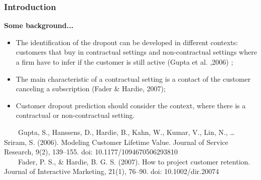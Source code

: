 \documentclass[10pt]{beamer}
\begin{document}
\begin{frame}
	\frametitle{Introduction}
	\Large
	\textbf{Some background...}\\
		\begin{itemize} \normalsize
			\item The identification of the dropout can be developed in different contexts: customers that buy in contractual settings and non-contractual settings where a firm have to infer if the customer is still active \footnotesize(Gupta et al. ,2006) \normalsize;
			\item The main characteristic of a contractual setting is a contact of the customer canceling a subscription \footnotesize(Fader \& Hardie, 2007)\normalsize;
			\item Customer dropout prediction should consider the context, where there is a contractual or non-contractual setting.
		\end{itemize}	
	\tiny
	~~~~Gupta, S., Hanssens, D., Hardie, B., Kahn, W., Kumar, V., Lin, N., … Sriram, S. (2006). Modeling Customer Lifetime Value. Journal of Service Research, 9(2), 139–155. doi: 10.1177/1094670506293810 \\
	~~~~Fader, P. S., \& Hardie, B. G. S. (2007). How to project customer retention. Journal of Interactive Marketing, 21(1), 76–90. doi: 10.1002/dir.20074\\
\end{frame}

\end{document}
